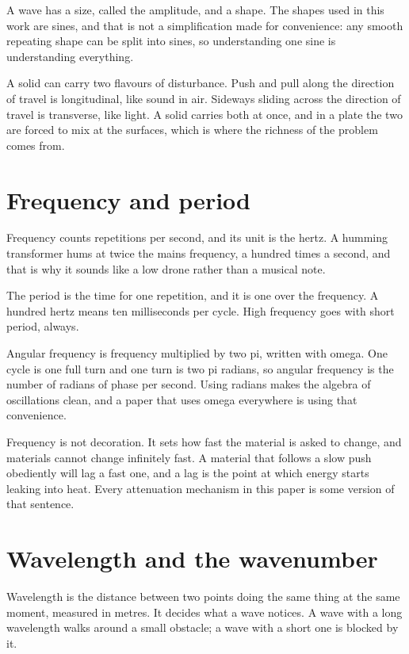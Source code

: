 \documentclass[11pt]{article}
\begin{document}
A wave has a size, called the amplitude, and a shape. The shapes used in this work are sines, and that is not
a simplification made for convenience: any smooth repeating shape can be split into sines, so understanding
one sine is understanding everything.

A solid can carry two flavours of disturbance. Push and pull along the direction of travel is longitudinal,
like sound in air. Sideways sliding across the direction of travel is transverse, like light. A solid carries
both at once, and in a plate the two are forced to mix at the surfaces, which is where the richness of the
problem comes from.

\section{Frequency and period}

Frequency counts repetitions per second, and its unit is the hertz. A humming transformer hums at twice the
mains frequency, a hundred times a second, and that is why it sounds like a low drone rather than a musical
note.

The period is the time for one repetition, and it is one over the frequency. A hundred hertz means ten
milliseconds per cycle. High frequency goes with short period, always.

Angular frequency is frequency multiplied by two pi, written with omega. One cycle is one full turn and one
turn is two pi radians, so angular frequency is the number of radians of phase per second. Using radians makes
the algebra of oscillations clean, and a paper that uses omega everywhere is using that convenience.

Frequency is not decoration. It sets how fast the material is asked to change, and materials cannot change
infinitely fast. A material that follows a slow push obediently will lag a fast one, and a lag is the point at
which energy starts leaking into heat. Every attenuation mechanism in this paper is some version of that
sentence.

\section{Wavelength and the wavenumber}

Wavelength is the distance between two points doing the same thing at the same moment, measured in metres.
It decides what a wave notices. A wave with a long wavelength walks around a small obstacle; a wave with a
short one is blocked by it.
\end{document}

